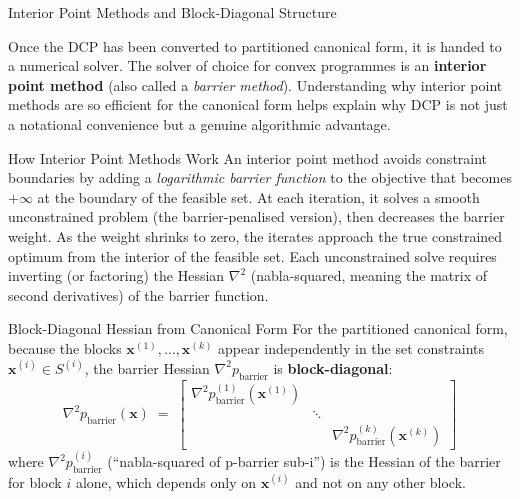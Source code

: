\documentclass[aspectratio=169,10pt]{beamer}
\begin{document}
\begin{frame}[allowframebreaks]{Interior Point Methods and Block-Diagonal Structure}

  Once the DCP has been converted to partitioned canonical form, it is
  handed to a numerical solver.  The solver of choice for convex
  programmes is an \textbf{interior point method} (also called a
  \emph{barrier method}).  Understanding why interior point methods are
  so efficient for the canonical form helps explain why DCP is not just
  a notational convenience but a genuine algorithmic advantage.

  \begin{block}{How Interior Point Methods Work}
    An interior point method avoids constraint boundaries by adding
    a \emph{logarithmic barrier function} to the objective that
    becomes $+\infty$ at the boundary of the feasible set.  At each
    iteration, it solves a smooth unconstrained problem (the
    barrier-penalised version), then decreases the barrier weight.
    As the weight shrinks to zero, the iterates approach the true
    constrained optimum from the interior of the feasible set.
    Each unconstrained solve requires inverting (or factoring) the
    Hessian $\nabla^2$ (nabla-squared, meaning the matrix of
    second derivatives) of the barrier function.
  \end{block}

  \begin{block}{Block-Diagonal Hessian from Canonical Form}
    For the partitioned canonical form, because the blocks
    $\mathbf{x}^{(1)}, \ldots, \mathbf{x}^{(k)}$ appear independently
    in the set constraints $\mathbf{x}^{(i)} \in S^{(i)}$, the
    barrier Hessian $\nabla^2 p_{\mathrm{barrier}}$ is
    \textbf{block-diagonal}:
    \[
      \nabla^2 p_{\mathrm{barrier}}(\mathbf{x}) \;=\;
      \begin{bmatrix}
        \nabla^2 p^{(1)}_{\mathrm{barrier}}(\mathbf{x}^{(1)}) & & \\
        & \ddots & \\
        & & \nabla^2 p^{(k)}_{\mathrm{barrier}}(\mathbf{x}^{(k)})
      \end{bmatrix}
    \]
    where $\nabla^2 p^{(i)}_{\mathrm{barrier}}$ (``nabla-squared of
    p-barrier sub-i'') is the Hessian of the barrier for block $i$
    alone, which depends only on $\mathbf{x}^{(i)}$ and not on any
    other block.
  \end{block}


\end{frame}
\end{document}
